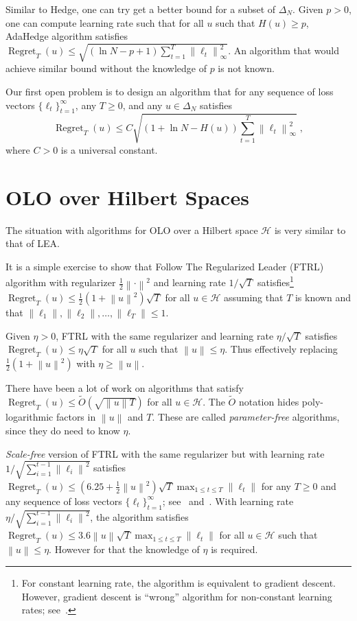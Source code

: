 \documentclass{colt2016} %
\DeclareMathOperator{\Regret}{Regret}
\renewcommand{\H}{\mathcal{H}}  %
\newcommand{\norm}[1]{\left\|{#1}\right\|}
\begin{document}
Similar to Hedge, one can try get a better bound for a subset of $\Delta_N$.
Given $p > 0$, one can compute learning rate such that for all $u$ such that
$H(u) \ge p$, AdaHedge algorithm satisfies $\Regret_T(u) \le \sqrt{(\ln N - p +
1) \sum_{t=1}^T \norm{\ell_t}_\infty^2}$. An algorithm that would achieve
similar bound without the knowledge of $p$ is not known.

Our first open problem is to design an algorithm that for any
sequence of loss vectors $\{\ell_t\}_{t=1}^\infty$, any $T \ge 0$,
and any $u \in \Delta_N$ satisfies
$$
\Regret_T(u) \le C \sqrt{(1 + \ln N - H(u)) \sum_{t=1}^T \norm{\ell_t}_\infty^2} \; ,
$$
where $C > 0$ is a universal constant.

\section{OLO over Hilbert Spaces}

The situation with algorithms for OLO over a Hilbert space $\H$ is very similar
to that of LEA.

It is a simple exercise to show that Follow The Regularized Leader (FTRL)
algorithm with regularizer $\frac{1}{2}\norm{\cdot}^2$ and learning rate
$1/\sqrt{T}$ satisfies\footnote{For constant learning rate, the algorithm is
equivalent to gradient descent. However, gradient descent is ``wrong'' algorithm
for non-constant learning rates; see~\cite{Orabona-Pal-2016-scale-free}.}
$\Regret_T(u) \le \frac{1}{2}(1 + \norm{u}^2) \sqrt{T}$ for all $u \in \H$
assuming that $T$ is known and that $\norm{\ell_1}, \norm{\ell_2}, \dots,
\norm{\ell_T} \le 1$.

Given $\eta > 0$, FTRL with the same regularizer and
learning rate $\eta/\sqrt{T}$ satisfies $\Regret_T(u) \le \eta \sqrt{T}$
for all $u$ such that $\norm{u} \le \eta$. Thus effectively replacing
$\frac{1}{2}(1 + \norm{u}^2)$ with $\eta \ge \norm{u}$.

There have been a lot of work \citep{Streeter-McMahan-2012, Orabona-2013,
McMahan-Abernethy-2013, McMahan-Orabona-2014} on algorithms that satisfy
$\Regret_T(u) \le \widetilde O(\sqrt{\norm{u} T})$ for all $u \in \H$.
The $\widetilde O$ notation hides poly-logarithmic factors in $\norm{u}$ and
$T$. These are called \emph{parameter-free} algorithms, since they do need to
know $\eta$.

\emph{Scale-free} version of FTRL with the same regularizer but with learning
rate $1/\sqrt{\sum_{i=1}^{t-1} \norm{\ell_i}^2}$ satisfies $\Regret_T(u) \le
(6.25 + \frac{1}{2}\norm{u}^2) \sqrt{T} \max_{1 \le t \le T} \norm{\ell_t}$ for
any $T \ge 0$ and any sequence of loss vectors $\{\ell_t\}_{t=1}^\infty$;
see~\cite{Orabona-Pal-2015} and~\cite{Duchi-Hazan-Singer-2011}. With learning
rate $\eta/\sqrt{\sum_{i=1}^{t-1} \norm{\ell_i}^2}$, the algorithm satisfies
$\Regret_T(u) \le 3.6 \norm{u} \sqrt{T} \max_{1 \le t \le T} \norm{\ell_t}$ for
all $u \in \H$ such that $\norm{u} \le \eta$. However for that the knowledge
of $\eta$ is required.
\end{document}

